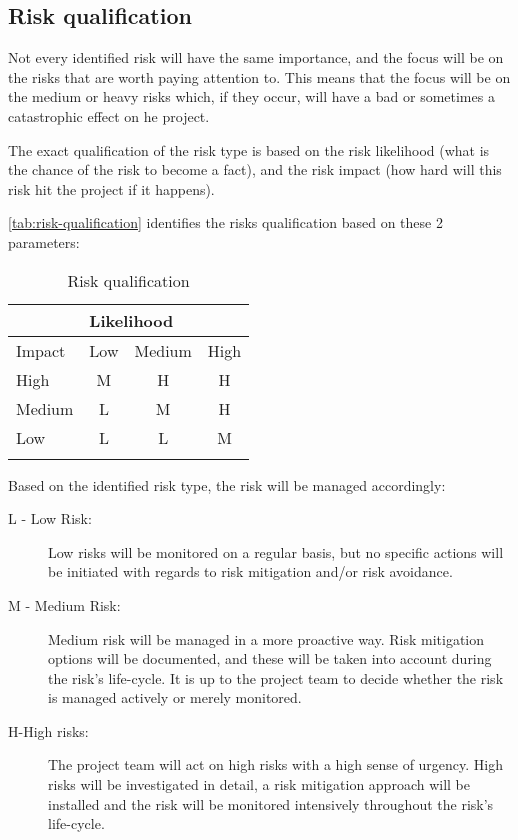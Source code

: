 \subsection{Risk qualification}
Not every identified risk will have the same importance, and the focus will be on the risks that are worth paying attention to.
This means that the focus will be on the medium or heavy risks which, if they occur, will have a bad or sometimes a catastrophic effect on he project.

The exact qualification of the risk type is based on the risk likelihood (what is the chance of the risk to become a fact), and the risk impact (how hard will this risk hit the project if it happens).

\autoref{tab:risk-qualification} identifies the risks qualification based on these 2 parameters:

\begin{longtable}{|l|c|c|c|}
\hline
       & \multicolumn{3}{l|}{Likelihood}                                                     \\ \hline
Impact & Low                       & Medium                      & High                      \\ \hline
High   & \cellcolor[HTML]{FFCB2F}M & \cellcolor[HTML]{FE0000}H   & \cellcolor[HTML]{FE0000}H \\ \hline
Medium & \cellcolor[HTML]{34FF34}L & \cellcolor[HTML]{FFCB2F}M   & \cellcolor[HTML]{FE0000}H \\ \hline
Low    & \cellcolor[HTML]{34FF34}L & \cellcolor[HTML]{34FF34}L   & \cellcolor[HTML]{FFC702}M \\ \hline
\caption{Risk qualification}
\label{tab:risk-qualification}
\end{longtable}

\noindent
Based on the identified risk type, the risk will be managed accordingly:
\begin{description}
	\item [L - Low Risk:]
	Low risks will be monitored on a regular basis, but no specific actions will be initiated with regards to risk mitigation and/or risk avoidance.
	\item [M - Medium Risk:]
	Medium risk will be managed in a more proactive way.
	Risk mitigation options will be documented, and these will be taken into account during the risk's life-cycle.
	It is up to the project team to decide whether the risk is managed actively or merely monitored.
	\item[H-High risks:]
	The project team will act on high risks with a high sense of urgency.
	High risks will be investigated in detail, a risk mitigation approach will be installed and the risk will be monitored intensively throughout the risk's life-cycle.
\end {description}

